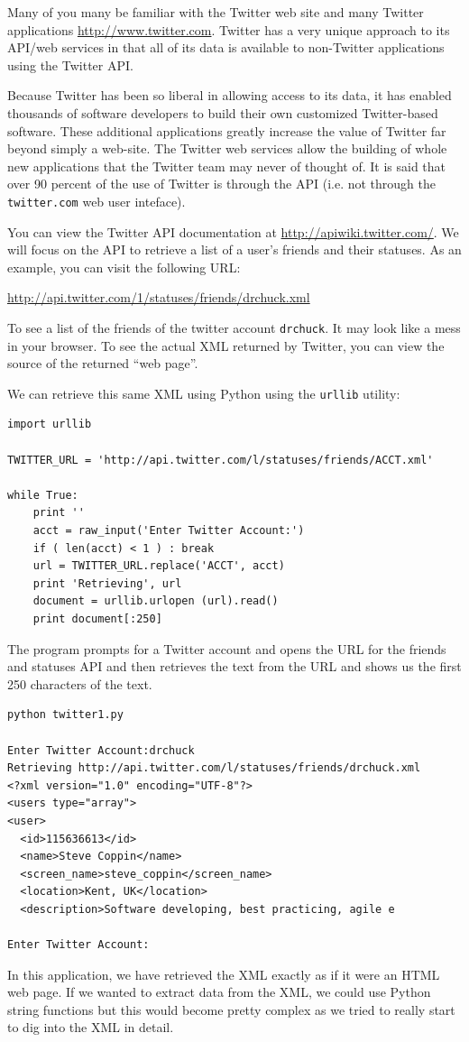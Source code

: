 Many of you many be familiar with the Twitter web site and many Twitter
applications \url{http://www.twitter.com}.  Twitter has a very unique
approach to its API/web services in that all of its data is available
to non-Twitter applications using the Twitter API.

Because Twitter has been so liberal in allowing access to its data,
it has enabled thousands of software developers to build their own
customized Twitter-based software.  These additional applications greatly
increase the value of Twitter far beyond simply a web-site.  The 
Twitter web services allow the building of whole new applications that
the Twitter team may never of thought of.  It is said that over 90 percent
of the use of Twitter is through the API (i.e. not through the {\tt twitter.com}
web user inteface).

You can view the Twitter API documentation at 
\url{http://apiwiki.twitter.com/}.  We will focus on the API
to retrieve a list of a user's friends and their statuses.  As an 
example, you can visit the following URL:

\url{http://api.twitter.com/1/statuses/friends/drchuck.xml}

To see a list of the friends of the twitter account {\tt drchuck}.
It may look like a mess in your browser.   To see the actual XML
returned by Twitter, you can view the source of the returned
``web page''.

We can retrieve this same XML using Python using the {\tt urllib}
utility:

\beforeverb
\begin{verbatim}
import urllib

TWITTER_URL = 'http://api.twitter.com/l/statuses/friends/ACCT.xml'

while True:
    print ''
    acct = raw_input('Enter Twitter Account:')
    if ( len(acct) < 1 ) : break
    url = TWITTER_URL.replace('ACCT', acct)
    print 'Retrieving', url
    document = urllib.urlopen (url).read()
    print document[:250]
\end{verbatim}
\afterverb
%
The program prompts for a Twitter account and opens the URL
for the friends and statuses API and then retrieves the 
text from the URL and shows us the first 250 characters of
the text.

\beforeverb
\begin{verbatim}
python twitter1.py

Enter Twitter Account:drchuck
Retrieving http://api.twitter.com/l/statuses/friends/drchuck.xml
<?xml version="1.0" encoding="UTF-8"?>
<users type="array">
<user>
  <id>115636613</id>
  <name>Steve Coppin</name>
  <screen_name>steve_coppin</screen_name>
  <location>Kent, UK</location>
  <description>Software developing, best practicing, agile e

Enter Twitter Account:
\end{verbatim}
\afterverb
%
In this application, we have retrieved the XML exactly as if it were
an HTML web page.  If we wanted to extract data from the XML, we 
could use Python string functions but this would become pretty complex
as we tried to really start to dig into the XML in detail.

